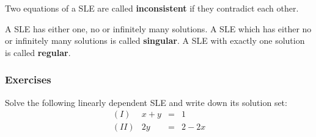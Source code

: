 \begin{tcolorbox}[colback=white]
\begin{definition}
Two equations of a SLE are called \textbf{inconsistent} if they contradict each other.
\end{definition}
\end{tcolorbox}
\vsp\vsp

\begin{tcolorbox}[colback=white]
\begin{theorem}
A SLE has either one, no or infinitely many solutions. A SLE which has either no or infinitely many solutions is called \textbf{singular}. A SLE with exactly one solution is called \textbf{regular}.

\end{theorem}
\end{tcolorbox}


\newpage

\subsubsection{Exercises}
\begin{exer}
Solve the following linearly dependent SLE and write down its solution set:
\[
\begin{array}{lrcl}
(I)&x+y&=&1\\
(II)&2y&=&2-2x\\
\end{array}
\]
\end{exer}
\vfill

